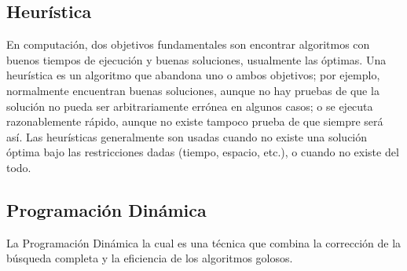 \subsection{Heurística}
En computación, dos objetivos fundamentales son encontrar algoritmos con buenos tiempos de ejecución y buenas soluciones, usualmente las óptimas. Una heurística es un algoritmo que abandona uno o ambos objetivos; por ejemplo, normalmente encuentran buenas soluciones, aunque no hay pruebas de que la solución no pueda ser arbitrariamente errónea en algunos casos; o se ejecuta razonablemente rápido, aunque no existe tampoco prueba de que siempre será así. Las heurísticas generalmente son usadas cuando no existe una solución óptima bajo las restricciones dadas (tiempo, espacio, etc.), o cuando no existe del todo.

\subsection{Programación Dinámica}
La Programación Dinámica la cual es una técnica que combina la corrección de la búsqueda completa y la eficiencia de los algoritmos golosos.